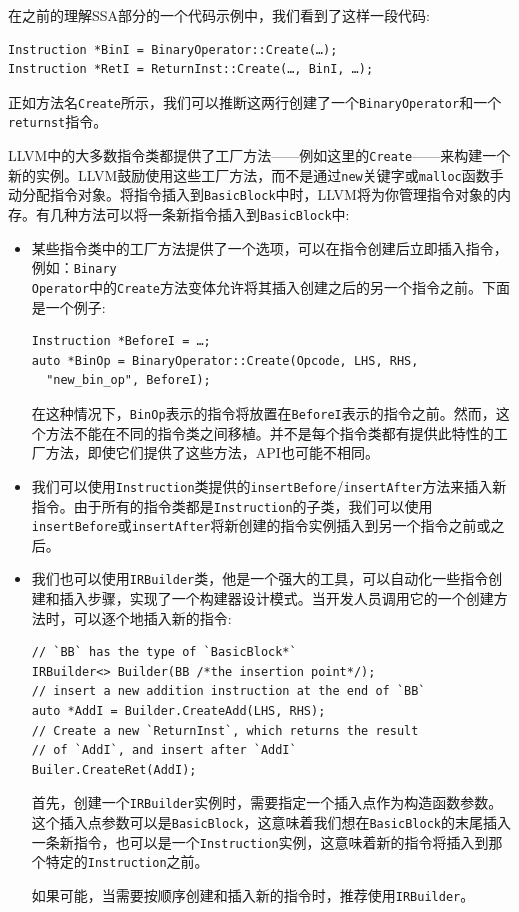 在之前的理解SSA部分的一个代码示例中，我们看到了这样一段代码:

\begin{lstlisting}[style=styleCXX]
Instruction *BinI = BinaryOperator::Create(…);
Instruction *RetI = ReturnInst::Create(…, BinI, …);
\end{lstlisting}

正如方法名\texttt{Create}所示，我们可以推断这两行创建了一个\texttt{BinaryOperator}和一个\texttt{returnst}指令。

LLVM中的大多数指令类都提供了工厂方法——例如这里的\texttt{Create}——来构建一个新的实例。LLVM鼓励使用这些工厂方法，而不是通过\texttt{new}关键字或\texttt{malloc}函数手动分配指令对象。将指令插入到\texttt{BasicBlock}中时，LLVM将为你管理指令对象的内存。有几种方法可以将一条新指令插入到\texttt{BasicBlock}中:

\begin{itemize}
\item 某些指令类中的工厂方法提供了一个选项，可以在指令创建后立即插入指令，例如：\texttt{Binary\\Operator}中的\texttt{Create}方法变体允许将其插入创建之后的另一个指令之前。下面是一个例子:

\begin{lstlisting}[style=styleCXX]
Instruction *BeforeI = …;
auto *BinOp = BinaryOperator::Create(Opcode, LHS, RHS,
  "new_bin_op", BeforeI);
\end{lstlisting}

在这种情况下，\texttt{BinOp}表示的指令将放置在\texttt{BeforeI}表示的指令之前。然而，这个方法不能在不同的指令类之间移植。并不是每个指令类都有提供此特性的工厂方法，即使它们提供了这些方法，API也可能不相同。

\item 我们可以使用\texttt{Instruction}类提供的\texttt{insertBefore}/\texttt{insertAfter}方法来插入新指令。由于所有的指令类都是\texttt{Instruction}的子类，我们可以使用\texttt{insertBefore}或\texttt{insertAfter}将新创建的指令实例插入到另一个指令之前或之后。
 
\item 我们也可以使用\texttt{IRBuilder}类，他是一个强大的工具，可以自动化一些指令创建和插入步骤，实现了一个构建器设计模式。当开发人员调用它的一个创建方法时，可以逐个地插入新的指令:

\begin{lstlisting}[style=styleCXX]
// `BB` has the type of `BasicBlock*`
IRBuilder<> Builder(BB /*the insertion point*/);
// insert a new addition instruction at the end of `BB`
auto *AddI = Builder.CreateAdd(LHS, RHS);
// Create a new `ReturnInst`, which returns the result
// of `AddI`, and insert after `AddI`
Builer.CreateRet(AddI);
\end{lstlisting}

首先，创建一个\texttt{IRBuilder}实例时，需要指定一个插入点作为构造函数参数。这个插入点参数可以是\texttt{BasicBlock}，这意味着我们想在\texttt{BasicBlock}的末尾插入一条新指令，也可以是一个\texttt{Instruction}实例，这意味着新的指令将插入到那个特定的\texttt{Instruction}之前。

如果可能，当需要按顺序创建和插入新的指令时，推荐使用\texttt{IRBuilder}。

\end{itemize}

